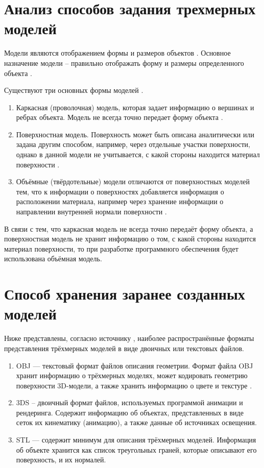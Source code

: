 \section{Анализ способов задания трехмерных моделей}

Модели являются отображением формы и размеров объектов \cite{kurov:2023}. 
Основное назначение модели – правильно отображать форму и размеры определенного объекта \cite{kurov:2023}. 

Существуют три основных формы моделей \cite{kurov:2023}.

\begin{enumerate}
	\item Каркасная (проволочная) модель, которая задает информацию о вершинах и ребрах объекта. Модель не всегда точно передает форму объекта \cite{kurov:2023}.
	\item Поверхностная модель. Поверхность может быть описана аналитически или задана другим способом, например, через отдельные участки поверхности, однако в данной модели не учитывается, с какой стороны находится материал поверхности \cite{kurov:2023}.
	\item Объёмные (твёрдотельные) модели отличаются от поверхностных моделей тем, что к информации о поверхностях добавляется информация о расположении материала, например через хранение информации о направлении внутренней нормали поверхности \cite{kurov:2023}. 
\end{enumerate}

В связи с тем, что каркасная модель не всегда точно передаёт форму объекта, а поверхностная модель не хранит информацию о том, с какой стороны находится материал поверхности, то при разработке программного обеспечения будет использована объёмная модель.

\section{Способ хранения заранее созданных моделей}

Ниже представлены, согласно источнику \cite{formats}, наиболее распространённые форматы представления трёхмерных моделей в виде двоичных или текстовых файлов.

\begin{enumerate}
	\item OBJ — текстовый формат файлов описания геометрии. 
	Формат файла OBJ хранит информацию о трёхмерных моделях, может кодировать геометрию поверхности 3D-модели, а также хранить информацию о цвете и текстуре \cite{formats}.
	\item 3DS – двоичный формат файлов, используемых программой анимации и рендеринга.
	Содержит информацию об объектах, представленных в виде сеток их кинематику (анимацию), а также данные об источниках освещения.
	\item STL — содержит минимум для описания трёхмерных моделей. Информация об объекте хранится как список треугольных граней, которые описывают его поверхность, и их нормалей.
\end{enumerate}

